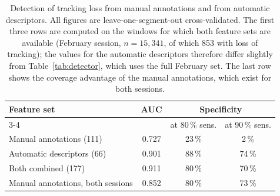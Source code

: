 \begin{table}[t]
\centering
\caption{Detection of tracking loss from manual annotations and from automatic descriptors. All figures are leave-one-segment-out cross-validated. The first three rows are computed on the windows for which both feature sets are available (February session, $n=15,341$, of which 853 with loss of tracking); the values for the automatic descriptors therefore differ slightly from Table~\ref{tab:detector}, which uses the full February set. The last row shows the coverage advantage of the manual annotations, which exist for both sessions.}\label{tab:subj_vs_obj}
\begin{tabular}{lccc}
\toprule
Feature set & AUC & \multicolumn{2}{c}{Specificity} \\
\cmidrule(l){3-4}
 & & at 80\,\% sens. & at 90\,\% sens. \\
\midrule
Manual annotations (111) & 0.727 & 23\,\% & 2\,\% \\
Automatic descriptors (66) & 0.901 & 88\,\% & 74\,\% \\
Both combined (177) & 0.911 & 80\,\% & 70\,\% \\
\addlinespace
Manual annotations, both sessions & 0.852 & 80\,\% & 73\,\% \\
\bottomrule
\end{tabular}
\end{table}